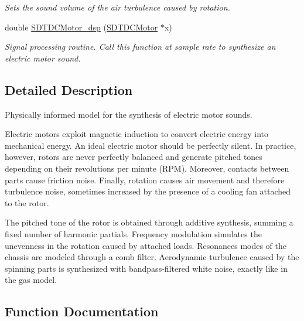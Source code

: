 \begin{DoxyCompactItemize}
\begin{DoxyCompactList}\small\item\em Sets the sound volume of the air turbulence caused by rotation. \end{DoxyCompactList}\item 
double \hyperlink{group__dcmotor_ga9901fc9e89e42b93d5fdedec0f6d025c}{S\+D\+T\+D\+C\+Motor\+\_\+dsp} (\hyperlink{group__dcmotor_ga55042fc98f1704ef2f8dd270e90c4cef}{S\+D\+T\+D\+C\+Motor} $\ast$x)
\begin{DoxyCompactList}\small\item\em Signal processing routine. Call this function at sample rate to synthesize an electric motor sound. \end{DoxyCompactList}\end{DoxyCompactItemize}


\subsection{Detailed Description}
Physically informed model for the synthesis of electric motor sounds.

Electric motors exploit magnetic induction to convert electric energy into mechanical energy. An ideal electric motor should be perfectly silent. In practice, however, rotors are never perfectly balanced and generate pitched tones depending on their revolutions per minute (R\+P\+M). Moreover, contacts between parts cause friction noise. Finally, rotation causes air movement and therefore turbulence noise, sometimes increased by the presence of a cooling fan attached to the rotor.

The pitched tone of the rotor is obtained through additive synthesis, summing a fixed number of harmonic partials. Frequency modulation simulates the unevenness in the rotation caused by attached loads. Resonances modes of the chassis are modeled through a comb filter. Aerodynamic turbulence caused by the spinning parts is synthesized with bandpass-\/filtered white noise, exactly like in the gas model. 

\subsection{Function Documentation}
\hypertarget{group__dcmotor_ga9901fc9e89e42b93d5fdedec0f6d025c}{}
